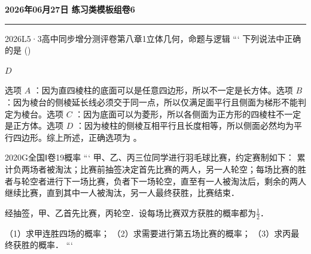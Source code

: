 \documentclass[12pt,UTF-8,a4paper]{ctexart}
\newcommand{\mytitle}{}
\numberwithin{figure}{section}
\theoremstyle{mystyle}
\theoremstyle{mystylekaishu}
\theoremstyle{mystyle}
\numberwithin{xiti}{section}
\begin{document}
\thispagestyle{plain} %
\renewcommand{\mytitle}{2026年06月27日 练习类模板组卷6}

\begin{center}
  {\Huge\bfseries\color{structure} \mytitle}
  \vspace{0.5em}
  
  \textcolor{structure}{\rule{\linewidth}{1.5pt}}
\end{center}
\vspace{1em}


\begin{problem}{2026}{L}{5·3高中同步增分测评卷第八章}{1}{立体几何，命题与逻辑}
```
下列说法中正确的是 (\hspace{1cm})
\begin{choices}
\end{choices}
\end{problem}

\begin{answer}
$D$
\end{answer}

\begin{solutions}
选项 $A$ ：因为直四棱柱的底面可以是任意四边形，所以不一定是长方体。选项 $B$ ：因为棱台的侧棱延长线必须交于同一点，所以仅满足面平行且侧面为梯形不能判定为棱台。选项 $C$ ：因为底面可以为菱形，所以各侧面为正方形的四棱柱不一定是正方体。选项 $D$ ：因为棱柱的侧棱互相平行且长度相等，所以侧面必然均为平行四边形。综上所述，正确选项为 。
\end{solutions}


\begin{problem}{2020}{G}{全国Ⅰ卷}{19}{概率}
```
甲、乙、丙三位同学进行羽毛球比赛，约定赛制如下：  
累计负两场者被淘汰；比赛前抽签决定首先比赛的两人，另一人轮空；每场比赛的胜者与轮空者进行下一场比赛，负者下一场轮空，直至有一人被淘汰后，剩余的两人继续比赛，直到其中一人被淘汰，另一人最终获胜，比赛结束．  

经抽签，甲、乙首先比赛，丙轮空．设每场比赛双方获胜的概率都为$\frac{1}{2}$．  

（1）求甲连胜四场的概率；  
（2）求需要进行第五场比赛的概率；  
（3）求丙最终获胜的概率．
```
\end{problem}
\end{document}
